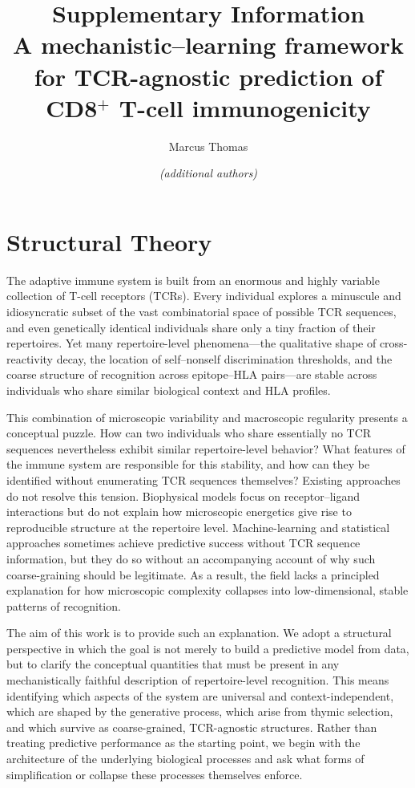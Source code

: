 \documentclass[11pt]{article}
\title{\textbf{Supplementary Information}\\
A mechanistic--learning framework for TCR-agnostic prediction of CD8$^{+}$ T-cell immunogenicity}
\author{Marcus Thomas \and \textit{(additional authors)}}
\date{}
\begin{document}
\maketitle

\tableofcontents
\newpage


\section{Structural Theory}
\label{sec:structural_theory}
The adaptive immune system is built from an enormous and highly variable collection of T-cell receptors (TCRs).  
Every individual explores a minuscule and idiosyncratic subset of the vast combinatorial space of possible TCR sequences, and even genetically identical individuals share only a tiny fraction of their repertoires.  
Yet many repertoire-level phenomena---the qualitative shape of cross-reactivity decay, the location of self–nonself discrimination thresholds, and the coarse structure of recognition across epitope–HLA pairs---are stable across individuals who share similar biological context and HLA profiles.  

This combination of microscopic variability and macroscopic regularity presents a conceptual puzzle.  
How can two individuals who share essentially no TCR sequences nevertheless exhibit similar repertoire-level behavior?  
What features of the immune system are responsible for this stability, and how can they be identified without enumerating TCR sequences themselves?  
Existing approaches do not resolve this tension.  
Biophysical models focus on receptor–ligand interactions but do not explain how microscopic energetics give rise to reproducible structure at the repertoire level.  
Machine-learning and statistical approaches sometimes achieve predictive success without TCR sequence information, but they do so without an accompanying account of why such coarse-graining should be legitimate.  
As a result, the field lacks a principled explanation for how microscopic complexity collapses into low-dimensional, stable patterns of recognition.

The aim of this work is to provide such an explanation.  
We adopt a structural perspective in which the goal is not merely to build a predictive model from data, but to clarify the conceptual quantities that must be present in any mechanistically faithful description of repertoire-level recognition.  
This means identifying which aspects of the system are universal and context-independent, which are shaped by the generative process, which arise from thymic selection, and which survive as coarse-grained, TCR-agnostic structures.  
Rather than treating predictive performance as the starting point, we begin with the architecture of the underlying biological processes and ask what forms of simplification or collapse these processes themselves enforce.
\end{document}
